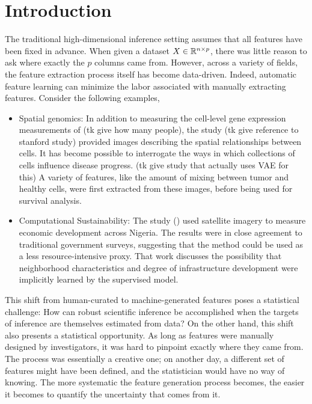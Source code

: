 \section{Introduction}

The traditional high-dimensional inference setting assumes that all features have been fixed in advance. When given a dataset $X \in \mathbb{R}^{n \times p}$, there was little reason to ask where exactly the $p$ columns came from. However, across a variety of fields, the feature extraction process itself has become data-driven. Indeed, automatic feature learning can minimize the labor associated with manually extracting features. Consider the following examples,

\begin{itemize}
\item Spatial genomics: In addition to measuring the cell-level gene expression measurements of (tk give how many people), the study (tk give reference to stanford study) provided images describing the spatial relationships between cells. It has become possible to interrogate the ways in which collections of cells influence disease progress. (tk give study that actually uses VAE for this) A variety of features, like the amount of mixing between tumor and healthy cells, were first extracted from these images, before being used for survival analysis.
\item Computational Sustainability: The study () used satellite imagery to measure economic development across Nigeria. The results were in close agreement to traditional government surveys, suggesting that the method could be used as a less resource-intensive proxy. That work discusses the possibility that neighborhood characteristics and degree of infrastructure development were implicitly learned by the supervised model.
\end{itemize}

This shift from human-curated to machine-generated features poses a statistical challenge: How can robust scientific inference be accomplished when the targets of inference are themselves estimated from data? On the other hand, this shift also presents a statistical opportunity. As long as features were manually designed by investigators, it was hard to pinpoint exactly where they came from. The process was essentially a creative one; on another day, a different set of features might have been defined, and the statistician would have no way of knowing. The more systematic the feature generation process becomes, the easier it becomes to quantify the uncertainty that comes from it.

